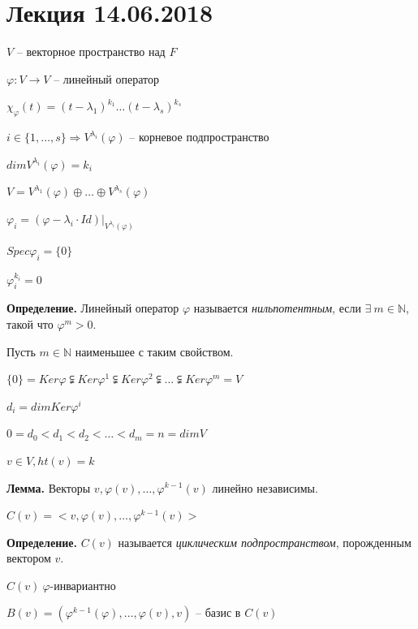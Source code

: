 \section{Лекция 14.06.2018}

$V$ -- векторное пространство над $F$

$\varphi: V \rightarrow V$ -- линейный оператор

$\chi_{\varphi} (t) = (t - \lambda_1)^{k_1} \dots (t - \lambda_s)^{k_s}$

$i \in \{1, \dots, s\} \Rightarrow V^{\lambda_i} (\varphi)$ -- корневое подпространство

$dim V^{\lambda_i} (\varphi) = k_i$

$V = V^{\lambda_1} (\varphi) \oplus \dots \oplus V^{\lambda_s} (\varphi)$

$\varphi_i = (\varphi - \lambda_i \cdot Id) | _{V^{\lambda_i} (\varphi)}$

$Spec \varphi_i = \{0\}$

$\varphi_i^{k_i} = 0$

\vspace{\baselineskip}
\textbf{Определение.} Линейный оператор $\varphi$ называется \textit{нильпотентным}, если $\exists \ m \in \mathbb{N}$, такой что $\varphi^m > 0$.

\vspace{\baselineskip}
Пусть $m \in \mathbb{N}$ наименьшее с таким свойством.

$\{0\} = Ker \varphi \subsetneqq Ker \varphi^1 \subsetneqq Ker \varphi^2 \subsetneqq \dots \subsetneqq Ker \varphi^m = V$

$d_i = dim Ker \varphi^i$

$0 = d_0 < d_1 < d_2 < \dots < d_m = n = dim V$

$v \in V, ht(v) = k$

\vspace{\baselineskip}
\textbf{Лемма.} Векторы $v, \varphi(v), \dots, \varphi^{k-1}(v)$ линейно независимы.

\vspace{\baselineskip}
$C(v) = <v, \varphi(v), \dots, \varphi^{k-1} (v)>$

\vspace{\baselineskip}
\textbf{Определение.} $C(v)$ называется \textit{циклическим подпространством}, порожденным вектором $v$.

\vspace{\baselineskip}
$C(v) \ \varphi$-инвариантно

\vspace{\baselineskip}
$B(v) = (\varphi^{k-1} (\varphi), \dots, \varphi(v), v)$ -- базис в $C(v)$

